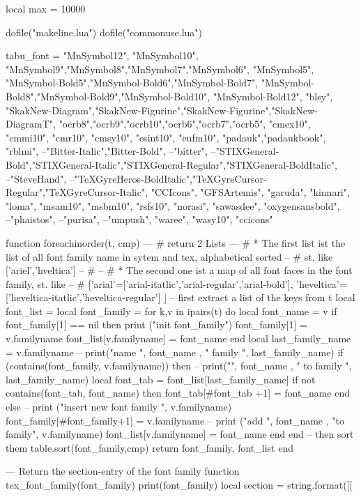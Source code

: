 ﻿\documentclass[12pt,a4paper]{article}
\begin{document}
\begin{luacode*}

local max = 10000

dofile("makeline.lua")
dofile("commonuse.lua")


tabu_font = {
"MnSymbol12", "MnSymbol10", "MnSymbol9","MnSymbol8","MnSymbol7","MnSymbol6", "MnSymbol5",
"MnSymbol-Bold5","MnSymbol-Bold6","MnSymbol-Bold7", "MnSymbol-Bold8","MnSymbol-Bold9","MnSymbol-Bold10", "MnSymbol-Bold12",
"blsy",
"SkakNew-Diagram","SkakNew-Figurine","SkakNew-Figurine","SkakNew-DiagramT",
"ocrb8","ocrb9","ocrb10","ocrb6","ocrb7","ocrb5",
"cmex10",
"cmmi10",
"cmr10",
"cmsy10",
"esint10",
"eufm10",
"padauk","padaukbook",
"rblmi",
--"Bitter-Italic","Bitter-Bold",
--"bitter",
--"STIXGeneral-Bold","STIXGeneral-Italic","STIXGeneral-Regular","STIXGeneral-BoldItalic",
--"SteveHand",
--"TeXGyreHeros-BoldItalic","TeXGyreCursor-Regular","TeXGyreCursor-Italic",
"CCIcons",
"GFSArtemis",
"garuda",
"kinnari",
"loma",
"msam10",
"msbm10",
"rsfs10",
"norasi",
"sawasdee",
"oxygensansbold",
--"phaistos",
--"purisa",
--"umpush",
"waree",
"wasy10",
"ccicons"
}


function foreachinorder(t, cmp)
	--- # return 2 Lists
	--- # * The first list ist the list of all font family name in sytem and tex, alphabetical sorted
	--  # st. like ['ariel','hveltica']
	--  # 
	--  # * The second one ist a map of all font faces in the font family, st. like
	--  # ['arial'=['arial-itatlic','arial-regular','arial-bold'], 'heveltica'=['heveltica-itatlic','heveltica-regular'] ]
    -- first extract a list of the keys from t
    local font_list = {}
    local font_family = {}
    for k,v in ipairs(t) do
		local font_name = v
		if font_family[1] == nil then
			print ("init font_family")
			font_family[1] = v.familyname
			font_list[v.familyname] = {font_name}
		end
		local last_family_name = v.familyname
		-- print("name ", font_name , " family ", last_family_name)
		if (contains(font_family, v.familyname)) then
			-- print("", font_name , " to family ", last_family_name)
			local font_tab = font_list[last_family_name]
			if not contains(font_tab, font_name) then
				font_tab[#font_tab +1] = font_name
			end
		else
			-- print ("insert new font family ", v.familyname)
			font_family[#font_family+1] = v.familyname
			-- print ("add ", font_name , "to family", v.familyname)
			font_list[v.familyname] = {font_name}
		end
    end
 	-- then sort them   
    table.sort(font_family,cmp)
    return font_family, font_list
end


--- Return the section-entry of the font family
function tex_font_family(font_family)
	print(font_family)
	local section = string.format([[

\end{luacode*}
\end{document}
